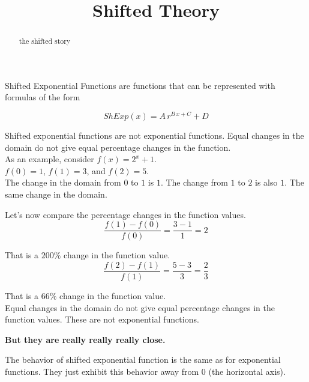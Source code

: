 \documentclass{ximera}
\title{Shifted Theory}
\begin{document}
\begin{abstract}
the shifted story
\end{abstract}
\maketitle





Shifted Exponential Functions are functions that can be represented with formulas of the form

\[
ShExp(x) = A \, r^{B \, x + C} + D
\]



Shifted exponential functions are not exponential functions.  Equal changes in the domain do not give equal percentage changes in the function. \\



As an example, consider $f(x) = 2^{x} + 1$. \\


$f(0) = 1$, $f(1) = 3$, and $f(2) = 5$. \\

The change in the domain from $0$ to $1$ is $1$.  The change from $1$ to $2$ is also $1$. The same change in the domain.

Let's now compare the percentage changes in the function values. \\



\[
\frac{f(1) - f(0)}{f(0)} = \frac{3 - 1}{1} = 2
\]

That is a $200\%$ change in the function value. \\





\[
\frac{f(2) - f(1)}{f(1)} = \frac{5 - 3}{3} = \frac{2}{3}
\]

That is a $66\%$ change in the function value. \\




Equal changes in the domain do not give equal percentage changes in the function values.   These are not exponential functions.


\begin{center}
\textbf{But they are really really really close.} \\
\end{center}


The behavior of shifted exponential function is the same as for exponential functions.  They just exhibit this behavior away from $0$ (the horizontal axis).\\
\end{document}

